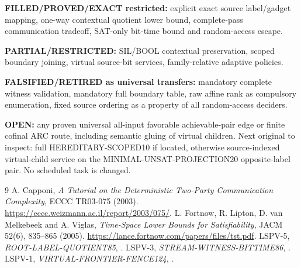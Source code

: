 \documentclass[11pt]{article}
\begin{document}
\par\noindent\textbf{FILLED/PROVED/EXACT restricted:} explicit exact source label/gadget mapping, one-way contextual quotient lower bound, complete-pass communication tradeoff, SAT-only bit-time bound and random-access escape. 
\par\noindent\textbf{PARTIAL/RESTRICTED:} SIL/BOOL contextual preservation, scoped boundary joining, virtual source-bit services, family-relative adaptive policies.
\par\noindent\textbf{FALSIFIED/RETIRED as universal transfers:} mandatory complete witness validation, mandatory full boundary table, raw affine rank as compulsory enumeration, fixed source ordering as a property of all random-access deciders.
\par\noindent\textbf{OPEN:} any proven universal all-input favorable achievable-pair edge or finite cofinal ARC route, including semantic gluing of virtual children. Next original to inspect: full HEREDITARY-SCOPED10 if located, otherwise source-indexed virtual-child service on the MINIMAL-UNSAT-PROJECTION20 opposite-label pair. No scheduled task is changed.

\begin{thebibliography}{9}
 A. Capponi, \emph{A Tutorial on the Deterministic Two-Party Communication Complexity}, ECCC TR03-075 (2003). \url{https://eccc.weizmann.ac.il/report/2003/075/}.
 L. Fortnow, R. Lipton, D. van Melkebeek and A. Viglas, \emph{Time-Space Lower Bounds for Satisfiability}, JACM 52(6), 835--865 (2005). \url{https://lance.fortnow.com/papers/files/tst.pdf}.
 LSPV-5, \emph{ROOT-LABEL-QUOTIENT85}, .
 LSPV-3, \emph{STREAM-WITNESS-BITTIME86}, .
 LSPV-1, \emph{VIRTUAL-FRONTIER-FENCE124}, .
\end{thebibliography}
\end{document}
